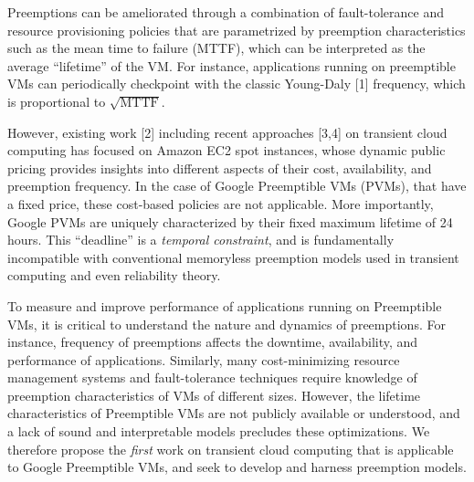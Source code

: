 Preemptions can be ameliorated through a combination of fault-tolerance and resource provisioning policies that are parametrized by preemption characteristics such as the mean time to failure (MTTF), which can be interpreted as the average ``lifetime'' of the VM.  
For instance, applications running on preemptible VMs can periodically checkpoint with the classic Young-Daly [1] frequency, which is proportional to $\sqrt{\text{MTTF}}$. 

However, existing work [2] including recent approaches [3,4] on transient cloud computing has focused on Amazon EC2 spot instances, whose dynamic public pricing provides insights into different aspects of their cost, availability, and preemption frequency. 
In the case of Google Preemptible VMs (PVMs), that have a fixed price, these cost-based policies are not applicable. 
More importantly, Google PVMs are uniquely characterized by their fixed maximum lifetime of 24 hours.
This ``deadline'' is a \emph{temporal constraint}, and is fundamentally incompatible with conventional memoryless preemption models used in transient computing and even reliability theory. 


To measure and improve performance of applications running on Preemptible VMs, it is critical to understand the nature and dynamics of preemptions.
For instance, frequency of preemptions affects the downtime, availability, and performance of applications. 
Similarly, many cost-minimizing resource management systems and fault-tolerance techniques require knowledge of preemption characteristics of VMs of different sizes. 
However, the lifetime characteristics of Preemptible VMs are not publicly available or understood, and a lack of sound and interpretable models precludes these optimizations. 
We therefore propose the \emph{first} work on transient cloud computing that is applicable to Google Preemptible VMs, and seek to develop and harness preemption models. 



